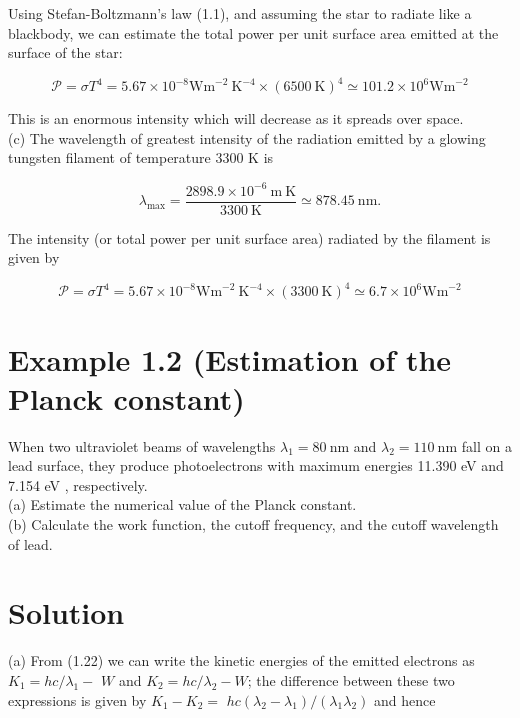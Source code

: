 \documentclass[10pt]{article}
\begin{document}
Using Stefan-Boltzmann's law (1.1), and assuming the star to radiate like a blackbody, we can estimate the total power per unit surface area emitted at the surface of the star:


\begin{equation*}
\mathcal{P}=\sigma T^{4}=5.67 \times 10^{-8} \mathrm{Wm}^{-2} \mathrm{~K}^{-4} \times(6500 \mathrm{~K})^{4} \simeq 101.2 \times 10^{6} \mathrm{Wm}^{-2} \tag{1.18}
\end{equation*}


This is an enormous intensity which will decrease as it spreads over space.\\
(c) The wavelength of greatest intensity of the radiation emitted by a glowing tungsten filament of temperature 3300 K is


\begin{equation*}
\lambda_{\max }=\frac{2898.9 \times 10^{-6} \mathrm{~m} \mathrm{~K}}{3300 \mathrm{~K}} \simeq 878.45 \mathrm{~nm} . \tag{1.19}
\end{equation*}


The intensity (or total power per unit surface area) radiated by the filament is given by


\begin{equation*}
\mathcal{P}=\sigma T^{4}=5.67 \times 10^{-8} \mathrm{Wm}^{-2} \mathrm{~K}^{-4} \times(3300 \mathrm{~K})^{4} \simeq 6.7 \times 10^{6} \mathrm{Wm}^{-2} \tag{1.20}
\end{equation*}


\section*{Example 1.2 (Estimation of the Planck constant)}
When two ultraviolet beams of wavelengths $\lambda_{1}=80 \mathrm{~nm}$ and $\lambda_{2}=110 \mathrm{~nm}$ fall on a lead surface, they produce photoelectrons with maximum energies 11.390 eV and 7.154 eV , respectively.\\
(a) Estimate the numerical value of the Planck constant.\\
(b) Calculate the work function, the cutoff frequency, and the cutoff wavelength of lead.

\section*{Solution}
(a) From (1.22) we can write the kinetic energies of the emitted electrons as $K_{1}=h c / \lambda_{1}-$ $W$ and $K_{2}=h c / \lambda_{2}-W$; the difference between these two expressions is given by $K_{1}-K_{2}=$ $h c\left(\lambda_{2}-\lambda_{1}\right) /\left(\lambda_{1} \lambda_{2}\right)$ and hence
\end{document}
